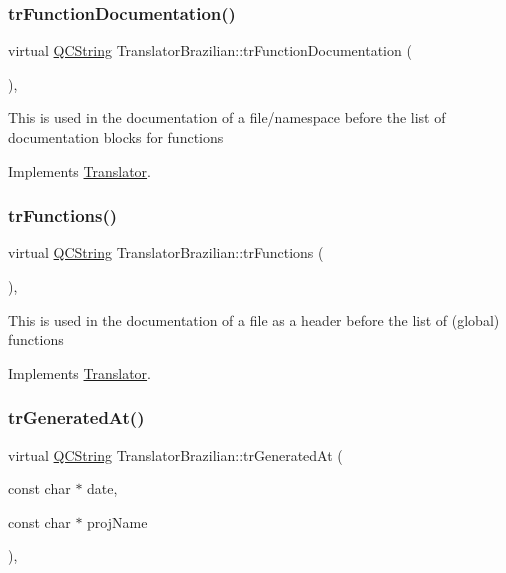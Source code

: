 \subsubsection{\texorpdfstring{trFunctionDocumentation()}{trFunctionDocumentation()}}
{\footnotesize\ttfamily virtual \mbox{\hyperlink{class_q_c_string}{Q\+C\+String}} Translator\+Brazilian\+::tr\+Function\+Documentation (\begin{DoxyParamCaption}{ }\end{DoxyParamCaption})\hspace{0.3cm}{\ttfamily [inline]}, {\ttfamily [virtual]}}

This is used in the documentation of a file/namespace before the list of documentation blocks for functions 

Implements \mbox{\hyperlink{class_translator}{Translator}}.

\mbox{\label{class_translator_brazilian_a79e6aafb40cc47e9c67dab6c0599519c}} 
\subsubsection{\texorpdfstring{trFunctions()}{trFunctions()}}
{\footnotesize\ttfamily virtual \mbox{\hyperlink{class_q_c_string}{Q\+C\+String}} Translator\+Brazilian\+::tr\+Functions (\begin{DoxyParamCaption}{ }\end{DoxyParamCaption})\hspace{0.3cm}{\ttfamily [inline]}, {\ttfamily [virtual]}}

This is used in the documentation of a file as a header before the list of (global) functions 

Implements \mbox{\hyperlink{class_translator}{Translator}}.

\mbox{\label{class_translator_brazilian_a619d0e75d37afb5b5f9e71149693113e}} 
\subsubsection{\texorpdfstring{trGeneratedAt()}{trGeneratedAt()}}
{\footnotesize\ttfamily virtual \mbox{\hyperlink{class_q_c_string}{Q\+C\+String}} Translator\+Brazilian\+::tr\+Generated\+At (\begin{DoxyParamCaption}\item[{const char $\ast$}]{date,  }\item[{const char $\ast$}]{proj\+Name }\end{DoxyParamCaption})\hspace{0.3cm}{\ttfamily [inline]}, {\ttfamily [virtual]}}

